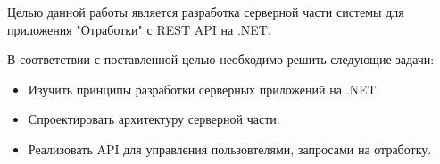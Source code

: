\intro


Целью данной работы является разработка серверной части системы для приложения "Отработки" с REST API на .NET.

В соответствии с поставленной целью необходимо решить следующие задачи:
\begin{itemize}
	\item{Изучить принципы разработки серверных приложений на .NET.}
	\item{Спроектировать архитектуру серверной части.}
	\item{Реализовать API для управления пользовтелями, запросами на отработку.}
\end{itemize}

